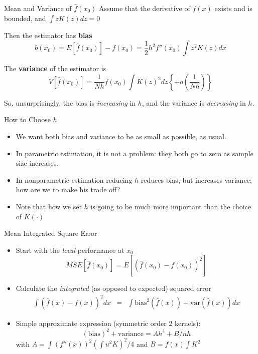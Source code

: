 \begin{frame}{Mean and Variance of $\hat{f}(x_0)$}
  Assume that the derivative of $f(x)$ exists and is bounded, and  $\int z K(z) d z = 0$

  Then the estimator has \textbf{bias}
  \[
    b(x_0) = E \left[\hat{f}(x_0) \right] - f(x_0) = \frac{1}{2} h^2 f''(x_0)\int z^2K(z)dx
  \]

  The \textbf{variance} of the estimator is
  \[
    V \left[\hat{f}(x_0) \right] = \frac{1}{Nh} f(x_0) \int K(z)^2dz \left\{ + o(\frac{1}{Nh}) \right\}
  \]

  So, unsurprisingly, the bias is \textit{increasing} in $h$, and the variance is \textit{decreasing} in $h$.
\end{frame}
 
\begin{frame}{How to Choose $h$}
  \begin{itemize}
    \item We want both bias and variance to be as small as possible, as usual. 
    \item In parametric estimation, it is not a problem: they both go to zero as sample size increases.
    \item In nonparametric estimation reducing $h$ reduces bias, but increases variance; how are we to make his trade off?
    \item Note that how we set $h$ is going to be much more important than the choice of $K(\cdot)$
  \end{itemize}  
\end{frame}

\begin{frame}{Mean Integrated Square Error}
  \begin{itemize}
    \item Start with the \textit{local} performance at $x_0$
    $$ MSE \left[ \hat{f}(x_0) \right] = E \left[ \left( \hat{f}(x_0) - f(x_0) \right)^2 \right] $$
    \item Calculate the \textit{integrated} (as opposed to expected) squared error 
    \begin{align*}
      \int \left( {\hat f}(x)-f(x) \right)^2 dx &=& \int \mbox{bias} ^2 \left( {\hat f}(x) \right) + \mbox{var} \left( {\hat f}(x) \right) dx 
    \end{align*}

  \item Simple approximate expression (symmetric order 2 kernels): $$(\mbox{bias})^2+\mbox{variance}= A
  h^4+B/nh$$
  with $A=\int \left(f''(x)\right)^2 \left(\int u^2K\right)^2 /4$ and $B=f(x)\int K^2$

\end{itemize}  
\end{frame}

